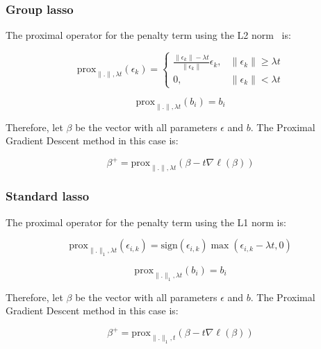 \documentclass{article}
\begin{document}
\subsubsection{Group lasso}

The proximal operator for the penalty term using the L2 norm\footnotemark~ is:


\[
\text{prox}_{\|.\|, \lambda t}(\epsilon_{k}) = 
\begin{cases}
\frac{\|\epsilon_{k}\| - \lambda t}{\|\epsilon_{k}\|}\epsilon_{k}, & \|\epsilon_{k}\| \ge \lambda t \\
0, & \|\epsilon_{k}\| < \lambda t
\end{cases}
\]

\[
\text{prox}_{\|.\|, \lambda t}(b_i) = b_i
\]

Therefore, let $\beta$ be the vector with all parameters $\epsilon$ and $b$. The Proximal Gradient Descent method in this case is:

\[
\beta^{+} = \text{prox}_{\|.\|, \lambda t}(\beta - t \nabla \ell(\beta))
\]

\subsubsection{Standard lasso}

The proximal operator for the penalty term using the L1 norm is:

\[
\text{prox}_{\|.\|_1, \lambda t}(\epsilon_{i, k}) = \text{sign}(\epsilon_{i, k})\max{(\epsilon_{i, k} - \lambda t, 0)}
\]

\[
\text{prox}_{\|.\|_1, \lambda t}(b_i) = b_i
\]

Therefore, let $\beta$ be the vector with all parameters $\epsilon$ and $b$. The Proximal Gradient Descent method in this case is:

\[
\beta^{+} = \text{prox}_{\|.\|_1, t}(\beta - t \nabla \ell(\beta))
\]
\end{document}
